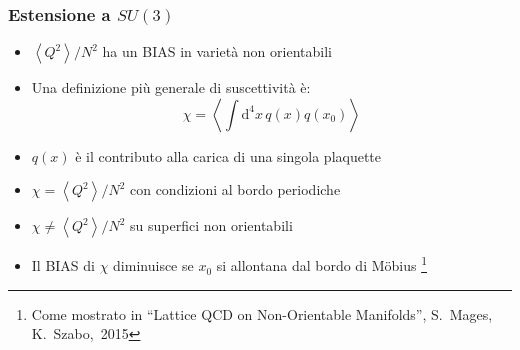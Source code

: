 \begin{frame}
    \begin{center}
    \end{center}
\end{frame}

\begin{frame}
    \frametitle{Estensione a $SU(3)$}
    \begin{itemize}
        \item $\left<Q^2\right>/N^2$ ha un BIAS in varietà non orientabili
        \item Una definizione più generale di suscettività è:
            $$\chi = \left<\int\mathrm d^4x\,q(x)q(x_0)\right>$$
        \item $q(x)$ è il contributo alla carica di una singola plaquette
        \item $\chi = \left<Q^2\right>/N^2$ con condizioni al bordo periodiche
        \item $\chi \neq \left<Q^2\right>/N^2$ su superfici non orientabili
        \item Il BIAS di $\chi$ diminuisce se $x_0$ si allontana dal bordo di M\"obius%
            \footnote{Come mostrato in ``Lattice QCD on Non-Orientable Manifolds'', %
            \mbox{S. Mages}, \mbox{K. Szabo, 2015}}
    \end{itemize}
\end{frame}

